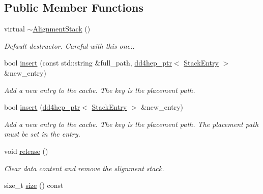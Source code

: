 \subsection*{Public Member Functions}
\begin{DoxyCompactItemize}
\item 
virtual \hyperlink{class_d_d4hep_1_1_alignments_1_1_alignment_stack_aaa0a50b4ba221d1591a3cdadbc06153c}{$\sim$AlignmentStack} ()
\begin{DoxyCompactList}\small\item\em Default destructor. Careful with this one:. \item\end{DoxyCompactList}\item 
bool \hyperlink{class_d_d4hep_1_1_alignments_1_1_alignment_stack_a4525563586574e54ce55ced7feead363}{insert} (const std::string \&full\_\-path, \hyperlink{class_d_d4hep_1_1dd4hep__ptr}{dd4hep\_\-ptr}$<$ \hyperlink{struct_d_d4hep_1_1_alignments_1_1_alignment_stack_1_1_stack_entry}{StackEntry} $>$ \&new\_\-entry)
\begin{DoxyCompactList}\small\item\em Add a new entry to the cache. The key is the placement path. \item\end{DoxyCompactList}\item 
bool \hyperlink{class_d_d4hep_1_1_alignments_1_1_alignment_stack_aefce20c233a0ad85d6a5c54ac2fb43b7}{insert} (\hyperlink{class_d_d4hep_1_1dd4hep__ptr}{dd4hep\_\-ptr}$<$ \hyperlink{struct_d_d4hep_1_1_alignments_1_1_alignment_stack_1_1_stack_entry}{StackEntry} $>$ \&new\_\-entry)
\begin{DoxyCompactList}\small\item\em Add a new entry to the cache. The key is the placement path. The placement path must be set in the entry. \item\end{DoxyCompactList}\item 
void \hyperlink{class_d_d4hep_1_1_alignments_1_1_alignment_stack_aaf6353204aae5bda656bdda70d1161aa}{release} ()
\begin{DoxyCompactList}\small\item\em Clear data content and remove the slignment stack. \item\end{DoxyCompactList}\item 
size\_\-t \hyperlink{class_d_d4hep_1_1_alignments_1_1_alignment_stack_af852a095659b263e9a7e2a10b04e0854}{size} () const 

\end{DoxyCompactItemize}

